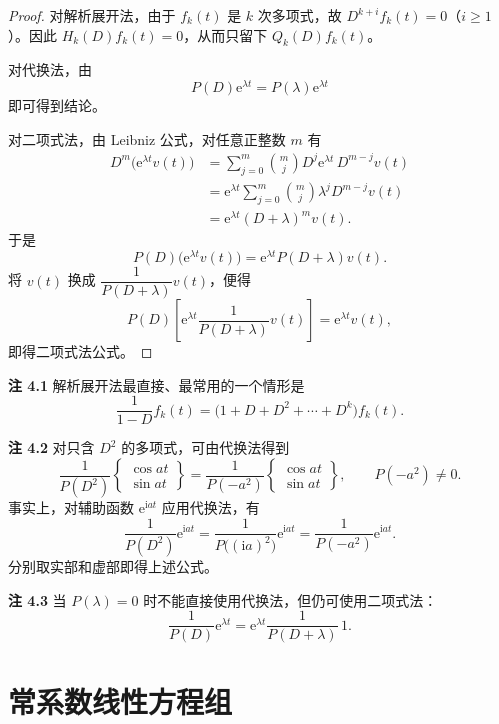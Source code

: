 \begin{proof}
	对解析展开法，由于 $f_k(t)$ 是 $k$ 次多项式，故
	$D^{k+i}f_k(t)=0$（$i\geq1$）。因此 $H_k(D)f_k(t)=0$，从而只留下
	$Q_k(D)f_k(t)$。

	对代换法，由
	\[
		P(D)\mathrm{e}^{\lambda t}=P(\lambda)\mathrm{e}^{\lambda t}
	\]
	即可得到结论。

	对二项式法，由 Leibniz 公式，对任意正整数 $m$ 有
	\[
		\begin{aligned}
		D^m\bigl(\mathrm{e}^{\lambda t}v(t)\bigr)
		&=\sum_{j=0}^{m}\binom{m}{j}
		D^j\mathrm{e}^{\lambda t}\,D^{m-j}v(t)\\
		&=\mathrm{e}^{\lambda t}
		\sum_{j=0}^{m}\binom{m}{j}\lambda^jD^{m-j}v(t)\\
		&=\mathrm{e}^{\lambda t}(D+\lambda)^mv(t).
		\end{aligned}
	\]
	于是
	\[
		P(D)\bigl(\mathrm{e}^{\lambda t}v(t)\bigr)
		=\mathrm{e}^{\lambda t}P(D+\lambda)v(t).
	\]
	将 $v(t)$ 换成 $\dfrac{1}{P(D+\lambda)}v(t)$，便得
	\[
		P(D)\left[
		\mathrm{e}^{\lambda t}\dfrac{1}{P(D+\lambda)}v(t)
		\right]
		=\mathrm{e}^{\lambda t}v(t),
	\]
	即得二项式法公式。
\end{proof}

\noindent\textbf{注 4.1}\quad
解析展开法最直接、最常用的一个情形是
\[
	\dfrac{1}{1-D}f_k(t)
	=\bigl(1+D+D^2+\cdots+D^k\bigr)f_k(t).
\]

\noindent\textbf{注 4.2}\quad
对只含 $D^2$ 的多项式，可由代换法得到
\[
	\dfrac{1}{P(D^2)}
	\begin{Bmatrix}
		\cos at\\
		\sin at
	\end{Bmatrix}
	=\dfrac{1}{P(-a^2)}
	\begin{Bmatrix}
		\cos at\\
		\sin at
	\end{Bmatrix},
	\qquad P(-a^2)\neq0.
\]
事实上，对辅助函数 $\mathrm{e}^{\mathrm{i}at}$ 应用代换法，有
\[
	\dfrac{1}{P(D^2)}\mathrm{e}^{\mathrm{i}at}
	=\dfrac{1}{P\bigl((\mathrm{i}a)^2\bigr)}\mathrm{e}^{\mathrm{i}at}
	=\dfrac{1}{P(-a^2)}\mathrm{e}^{\mathrm{i}at}.
\]
分别取实部和虚部即得上述公式。

\noindent\textbf{注 4.3}\quad
当 $P(\lambda)=0$ 时不能直接使用代换法，但仍可使用二项式法：
\[
	\dfrac{1}{P(D)}\mathrm{e}^{\lambda t}
	=\mathrm{e}^{\lambda t}\dfrac{1}{P(D+\lambda)}\,1.
\]

\section{常系数线性方程组}\label{sec:常系数线性方程组}


